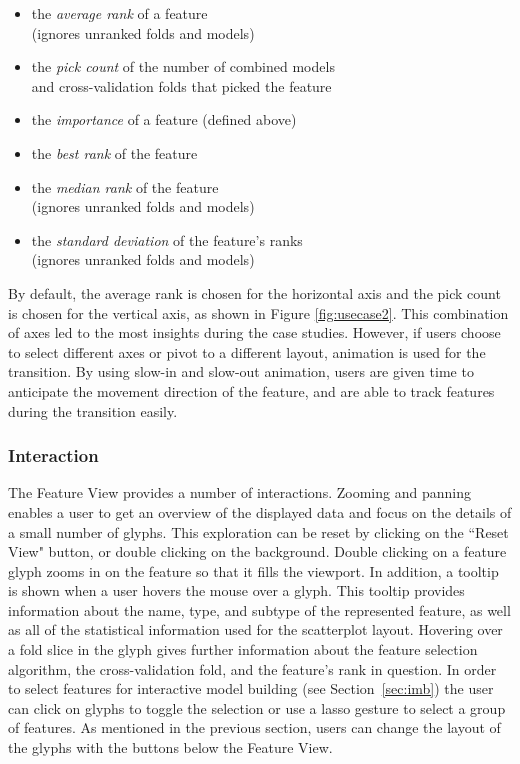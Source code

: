 \begin{itemize}
\item the \emph{average rank} of a feature\\
(ignores unranked folds and models)
\item the \emph{pick count} of the number of combined
models\\and cross-validation folds that picked the feature
\item the \emph{importance} of a feature (defined above)
\item the \emph{best rank} of the feature
\item the \emph{median rank} of the feature\\
(ignores unranked folds and models)
\item the \emph{standard deviation} of the feature's ranks\\
(ignores unranked folds and models)
\end{itemize}

By default, the average rank is chosen for the horizontal axis and
the pick count is chosen for the vertical axis, as shown in Figure \ref{fig:usecase2}.  This combination of axes led to the most insights during the case studies.  However, if users choose to select different axes or pivot to a different layout, animation is used for the transition.  By using slow-in and slow-out animation, users are given time to anticipate the movement direction of the feature, and are able to track features during the transition easily.


\subsubsection{Interaction}
The Feature View provides a number of interactions.
Zooming and panning enables a user to get an overview of the
displayed data and focus on the details of a small number of glyphs.  This exploration can be reset by clicking on the
``Reset View" button, or double clicking on the background. Double clicking on a feature glyph zooms in on the feature so that it fills the viewport.
In addition, a tooltip is shown when a user hovers the mouse
over a glyph. This tooltip provides information about the name, type,
and subtype of the represented feature, as well as all of the statistical
information used for the scatterplot layout. Hovering over a fold slice
in the glyph gives further information about the feature selection algorithm,
the cross-validation fold, and the feature's rank in question.  In order to select features for interactive model building
(see Section~\ref{sec:imb}) the user can click on glyphs to toggle
the selection or use a lasso gesture to select a group of features.
As mentioned in the previous section, users can change the
layout of the glyphs with the buttons below the Feature View.

